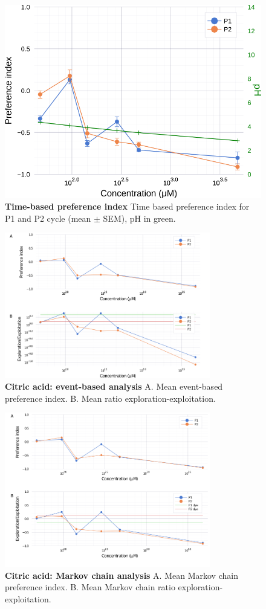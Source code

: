     \begin{figure}[h]
      \centering
      \includegraphics[width=.6\textwidth]{part_2/assets/citricacid.png}
      \caption{\textbf{Time-based preference index} Time based preference index for P1 and P2 cycle (mean $\pm$ SEM), pH in green. }
      \label{citric_acid}
    \end{figure}

    \begin{figure}[h]
      \centering
      \includegraphics[width=0.8\textwidth]{part_2/assets/citricacid_event.png}
      \caption{\textbf{Citric acid: event-based analysis} A. Mean event-based preference index. B. Mean ratio exploration-exploitation.}
      \label{citric_acid_event}
    \end{figure}

    \begin{figure}[h]
      \centering
      \includegraphics[width=0.8\textwidth]{part_2/assets/citricacid_markov.png}
      \caption{\textbf{Citric acid: Markov chain analysis} A. Mean Markov chain preference index. B. Mean Markov chain ratio exploration-exploitation.}
      \label{citric_acid_markov}
    \end{figure}


